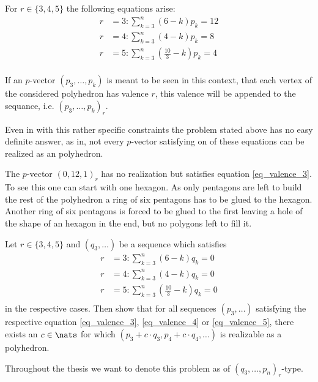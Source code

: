 For $r \in \{3, 4, 5\}$ the following equations arise:
\begin{align}
  r &= 3: \sum_{k=3}^n \left(6 - k \right) p_k = 12 \label{eq_valence_3}\\
  r &= 4: \sum_{k=3}^n \left(4 - k \right) p_k = 8  \label{eq_valence_4}\\
  r &= 5: \sum_{k=3}^n \left( \frac{10}{3} - k \right) p_k = 4 \label{eq_valence_5}\\
\end{align}
\begin{notation}
  If an $p$-vector $(p_3, \dots, p_k)$ is meant to be seen in this context, that each vertex of the considered polyhedron has valence $r$, this valence will be appended to the sequance, i.e. $(p_3, \dots, p_k)_r$.
\end{notation}
Even in with this rather specific constraints the problem stated above has no easy definite answer, as in, not every $p$-vector satisfying on of these equations can be realized as an polyhedron.
\begin{example}
  The $p$-vector $(0, 12, 1)_r$ has no realization but satisfies equation \ref{eq_valence_3}. To see this one can start with one hexagon. As only pentagons are left to build the rest of the polyhedron a ring of six pentagons has to be glued to the hexagon. Another ring of six pentagons is forced to be glued to the first leaving a hole of the shape of an hexagon in the end, but no polygons left to fill it.
\end{example}

\begin{problem}
  Let $r \in \{3, 4, 5\}$ and $(q_3, \dots)$ be a sequence which satisfies 
  \begin{align}
    r &= 3: \sum_{k=3}^n \left( 6            - k \right) q_k = 0 \label{eq_zero_curv_3}\\
    r &= 4: \sum_{k=3}^n \left( 4            - k \right) q_k = 0 \label{eq_zero_curv_4}\\
    r &= 5: \sum_{k=3}^n \left( \frac{10}{3} - k \right) q_k = 0 \label{eq_zero_curv_5}\\
  \end{align}
  in the respective cases. Then show that for all sequences $(p_3, \dots)$  satisfying the respective equation \ref{eq_valence_3}, \ref{eq_valence_4} or \ref{eq_valence_5}, there exists an $c \in \nats$ for which $(p_3 + c \cdot q_3, p_4 + c \cdot q_4, \dots)$ is realizable as a polyhedron.
\end{problem}
\begin{notation}
  Throughout the thesis we want to denote this problem as of $(q_3, \dots, p_n)_r$-type.
\end{notation}

